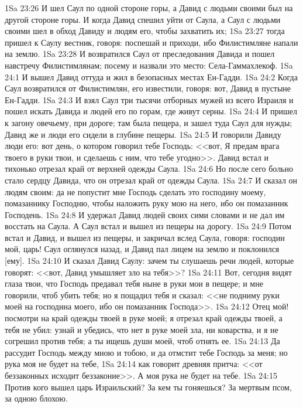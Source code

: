 \vs 1Sa 23:26 И шел Саул по одной стороне горы, а Давид с людьми своими был на другой стороне горы. И когда Давид спешил уйти от Саула, а Саул с людьми своими шел в обход Давиду и людям его, чтобы захватить их;
\vs 1Sa 23:27 тогда пришел к Саулу вестник, говоря: поспешай и приходи, ибо Филистимляне напали на землю.
\vs 1Sa 23:28 И возвратился Саул от преследования Давида и пошел навстречу Филистимлянам; посему и назвали это место: Села-Гаммахлекоф.
\vs 1Sa 24:1 И вышел Давид оттуда и жил в безопасных местах Ен-Гадди.
\vs 1Sa 24:2 Когда Саул возвратился от Филистимлян, его известили, говоря: вот, Давид в пустыне Ен-Гадди.
\vs 1Sa 24:3 И взял Саул три тысячи отборных мужей из всего Израиля и пошел искать Давида и людей его по горам, где живут серны.
\vs 1Sa 24:4 И пришел к загону овечьему, при дороге; там была пещера, и зашел туда Саул для нужды; Давид же и люди его сидели в глубине пещеры.
\vs 1Sa 24:5 И говорили Давиду люди его: вот день, о котором говорил тебе Господь: <<вот, Я предам врага твоего в руки твои, и сделаешь с ним, что тебе угодно>>. Давид встал и тихонько отрезал край от верхней одежды Саула.
\vs 1Sa 24:6 Но после сего больно стало сердцу Давида, что он отрезал край от одежды Саула.
\vs 1Sa 24:7 И сказал он людям своим: да не попустит мне Господь сделать это господину моему, помазаннику Господню, чтобы наложить руку мою на него, ибо он помазанник Господень.
\vs 1Sa 24:8 И удержал Давид людей своих сими словами и не дал им восстать на Саула. А Саул встал и вышел из пещеры на дорогу.
\vs 1Sa 24:9 Потом встал и Давид, и вышел из пещеры, и закричал вслед Саула, говоря: господин мой, царь! Саул оглянулся назад, и Давид пал лицем на землю и поклонился [ему].
\vs 1Sa 24:10 И сказал Давид Саулу: зачем ты слушаешь речи людей, которые говорят: <<вот, Давид умышляет зло на тебя>>?
\vs 1Sa 24:11 Вот, сегодня видят глаза твои, что Господь предавал тебя ныне в руки мои в пещере; и мне говорили, чтоб убить тебя; но я пощадил тебя и сказал: <<не подниму руки моей на господина моего, ибо он помазанник Господа>>.
\vs 1Sa 24:12 Отец мой! посмотри на край одежды твоей в руке моей; я отрезал край одежды твоей, а тебя не убил: узнай и убедись, что нет в руке моей зла, ни коварства, и я не согрешил против тебя; а ты ищешь души моей, чтоб отнять ее.
\vs 1Sa 24:13 Да рассудит Господь между мною и тобою, и да отмстит тебе Господь за меня; но рука моя не будет на тебе,
\vs 1Sa 24:14 как говорит древняя притча: <<от беззаконных исходит беззаконие>>. А моя рука не будет на тебе.
\vs 1Sa 24:15 Против кого вышел царь Израильский? За кем ты гоняешься? За мертвым псом, за одною блохою.
